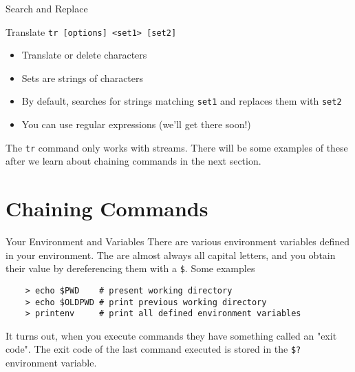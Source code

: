 \documentclass[11pt]{beamer}
\newcommand{\colbf}[1]{\textcolor{mLightBrown!77!black}{#1}}%
\begin{document}
\begin{frame}[fragile]{Search and Replace}
  \begin{block}{\colbf{Tr}anslate}
    \texttt{tr [options] <set1> [set2]}
    \begin{itemize}
      \item Translate or delete characters
      \item Sets are strings of characters
      \item By default, searches for strings matching \texttt{set1} and replaces them with \texttt{set2}
      \item You can use regular expressions (we'll get there soon!)
    \end{itemize}
  \end{block}

  The \texttt{tr} command only works with streams.  There will be some examples of these after we learn about
  chaining commands in the next section.
\end{frame}

%

%
\section{Chaining Commands}
\label{sec:chaining_commands}

\begin{frame}[fragile]{Your Environment and Variables}
  There are various environment variables defined in your environment.  The are almost always all capital letters,
  and you obtain their value by dereferencing them with a \texttt{\$}.  Some examples

  \begin{verbatim}
    > echo $PWD    # present working directory
    > echo $OLDPWD # print previous working directory
    > printenv     # print all defined environment variables
  \end{verbatim}

  It turns out, when you execute commands they have something called an "exit code".  The exit code of the last
  command executed is stored in the \texttt{\$?} environment variable.
\end{frame}
\end{document}
